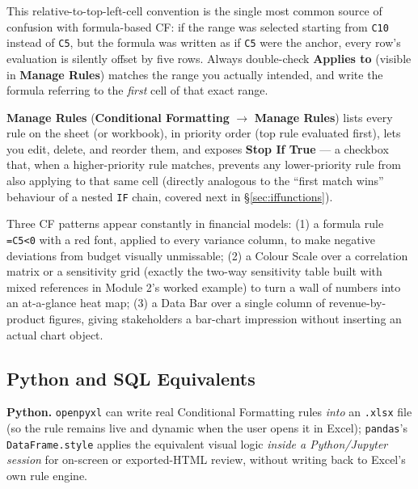 \documentclass[11pt,a4paper]{article}
\begin{document}
\begin{pitfall}
This relative-to-top-left-cell convention is the single most common source of confusion with formula-based CF: if the range was selected starting from \texttt{C10} instead of \texttt{C5}, but the formula was written as if \texttt{C5} were the anchor, every row's evaluation is silently offset by five rows. Always double-check \textbf{Applies to} (visible in \textbf{Manage Rules}) matches the range you actually intended, and write the formula referring to the \emph{first} cell of that exact range.
\end{pitfall}

\textbf{Manage Rules} (\textbf{Conditional Formatting} $\rightarrow$ \textbf{Manage Rules}) lists every rule on the sheet (or workbook), in priority order (top rule evaluated first), lets you edit, delete, and reorder them, and exposes \textbf{Stop If True} --- a checkbox that, when a higher-priority rule matches, prevents any lower-priority rule from also applying to that same cell (directly analogous to the ``first match wins'' behaviour of a nested \texttt{IF} chain, covered next in \S\ref{sec:iffunctions}).

\begin{financeapp}
Three CF patterns appear constantly in financial models: (1) a formula rule \texttt{=C5<0} with a red font, applied to every variance column, to make negative deviations from budget visually unmissable; (2) a Colour Scale over a correlation matrix or a sensitivity grid (exactly the two-way sensitivity table built with mixed references in Module 2's worked example) to turn a wall of numbers into an at-a-glance heat map; (3) a Data Bar over a single column of revenue-by-product figures, giving stakeholders a bar-chart impression without inserting an actual chart object.
\end{financeapp}

\subsection{Python and SQL Equivalents}

\textbf{Python.} \texttt{openpyxl} can write real Conditional Formatting rules \emph{into} an \texttt{.xlsx} file (so the rule remains live and dynamic when the user opens it in Excel); \texttt{pandas}'s \texttt{DataFrame.style} applies the equivalent visual logic \emph{inside a Python/Jupyter session} for on-screen or exported-HTML review, without writing back to Excel's own rule engine.
\end{document}
